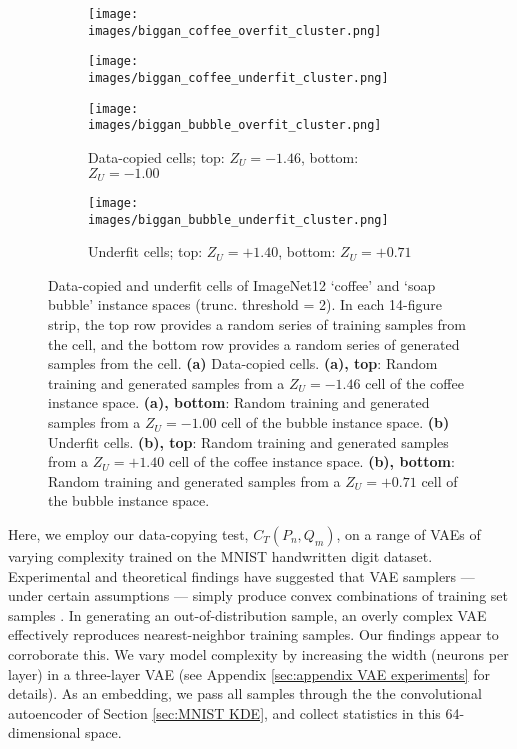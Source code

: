 \begin{figure*}[h]
    \centering
    \begin{subfigure}{0.49\linewidth}
        \centering
        \texttt{[image: images/biggan\_coffee\_overfit\_cluster.png]}
        \label{fig:biggan coffee overfit}
    \end{subfigure}
    \hfill
    \begin{subfigure}{0.49\linewidth}
        \centering
        \texttt{[image: images/biggan\_coffee\_underfit\_cluster.png]}
        \label{fig:biggan coffee underfit}
    \end{subfigure}
    \begin{subfigure}{0.49\linewidth}
        \centering
        \texttt{[image: images/biggan\_bubble\_overfit\_cluster.png]}
        \label{fig:biggan bubble overfit}
        \caption{Data-copied cells; top: $Z_U = -1.46$, bottom: $Z_U = -1.00$} 
    \end{subfigure}
    \hfill
    \begin{subfigure}{0.49\linewidth}
        \centering
        \texttt{[image: images/biggan\_bubble\_underfit\_cluster.png]}
        \label{fig:biggan bubble underfit}
        \caption{Underfit cells; top: $Z_U = +1.40$, bottom: $Z_U = +0.71$} 
    \end{subfigure}
    \caption{Data-copied and underfit cells of ImageNet12 `coffee' and `soap bubble' instance spaces (trunc. threshold = 2). In each 14-figure strip, the top row provides a random series of training samples from the cell, and the bottom row provides a random series of generated samples from the cell. \textbf{(a)} Data-copied cells. \textbf{(a), top}: Random training and generated samples from a $Z_U = -1.46$ cell of the coffee instance space. \textbf{(a), bottom}: Random training and generated samples from a $Z_U = -1.00$ cell of the bubble instance space. \textbf{(b)} Underfit cells. \textbf{(b), top}: Random training and generated samples from a $Z_U = +1.40$ cell of the coffee instance space. \textbf{(b), bottom}: Random training and generated samples from a $Z_U = +0.71$ cell of the bubble instance space.  }
    \label{fig:biggan overfit underfit}
\end{figure*}

Here, we employ our data-copying test, $C_T(P_n, Q_m)$, on a range of VAEs of varying complexity trained on the MNIST handwritten digit dataset. Experimental and theoretical findings have suggested that VAE samplers --- under certain assumptions --- simply produce convex combinations of training set samples \citep{VAEs_overfit}. In generating an out-of-distribution sample, an overly complex VAE effectively reproduces nearest-neighbor training samples. Our findings appear to corroborate this. We vary model complexity by increasing the width (neurons per layer) in a three-layer VAE (see Appendix \ref{sec:appendix VAE experiments} for details). As an embedding, we pass all samples through the the convolutional autoencoder of Section \ref{sec:MNIST KDE}, and collect statistics in this 64-dimensional space.  

